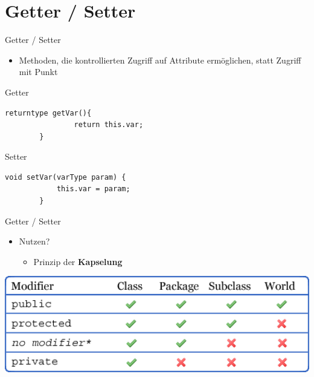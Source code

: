 \documentclass[18pt]{beamer}
\begin{document}
\section{Getter / Setter}
\begin{frame}[fragile]{Getter / Setter}
\begin{itemize}
\item Methoden, die kontrollierten Zugriff auf Attribute ermöglichen, statt Zugriff mit Punkt
\end{itemize}
\begin{exampleblock}{Getter}
	\begin{lstlisting}[basicstyle=\scriptsize]
		returntype getVar(){
				return this.var;
		}
	\end{lstlisting}
\end{exampleblock}

\begin{exampleblock}{Setter}
	\begin{lstlisting}[basicstyle=\scriptsize]
		void setVar(varType param) {
			this.var = param;
		}
	\end{lstlisting}
\end{exampleblock}
\end{frame}

\begin{frame}[fragile]{Getter / Setter}
\begin{itemize}
\item Nutzen? 
\begin{itemize}
\item  Prinzip der \textbf{Kapselung}
\end{itemize}
\end{itemize}
 \includegraphics[width=1.0\textwidth]{pa.png}
\end{frame}
\end{document}
